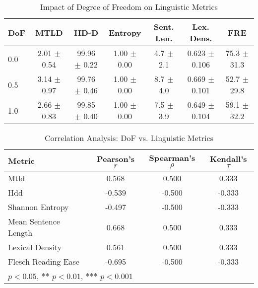 \begin{table}[htbp]
\centering
\caption{Impact of Degree of Freedom on Linguistic Metrics}
\label{tab:dof_metrics}
\begin{tabular}{lcccccc}
\toprule
DoF & MTLD & HD-D & Entropy & Sent. Len. & Lex. Dens. & FRE \\
\midrule
0.0 & 2.01 $\pm$ 0.54 & 99.96 $\pm$ 0.22 & 1.00 $\pm$ 0.00 & 4.7 $\pm$ 2.1 & 0.623 $\pm$ 0.106 & 75.3 $\pm$ 31.3 \\
0.5 & 3.14 $\pm$ 0.97 & 99.76 $\pm$ 0.46 & 1.00 $\pm$ 0.00 & 8.7 $\pm$ 4.0 & 0.669 $\pm$ 0.101 & 52.7 $\pm$ 29.8 \\
1.0 & 2.66 $\pm$ 0.83 & 99.85 $\pm$ 0.40 & 1.00 $\pm$ 0.00 & 7.5 $\pm$ 3.9 & 0.649 $\pm$ 0.104 & 59.1 $\pm$ 32.2 \\
\bottomrule
\end{tabular}
\end{table}

\begin{table}[htbp]
\centering
\caption{Correlation Analysis: DoF vs. Linguistic Metrics}
\label{tab:correlations}
\begin{tabular}{lccc}
\toprule
Metric & Pearson's $r$ & Spearman's $\rho$ & Kendall's $\tau$ \\
\midrule
Mtld & 0.568 & 0.500 & 0.333 \\
Hdd & -0.539 & -0.500 & -0.333 \\
Shannon Entropy & -0.497 & -0.500 & -0.333 \\
Mean Sentence Length & 0.668 & 0.500 & 0.333 \\
Lexical Density & 0.561 & 0.500 & 0.333 \\
Flesch Reading Ease & -0.695 & -0.500 & -0.333 \\
\bottomrule
\multicolumn{4}{l}{\footnotesize * $p < 0.05$, ** $p < 0.01$, *** $p < 0.001$} \\
\end{tabular}
\end{table}
